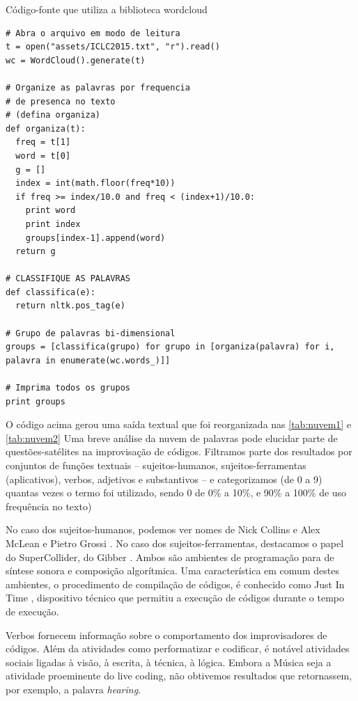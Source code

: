 \begin{example}{Código-fonte que utiliza a biblioteca wordcloud}  
\begin{verbatim}
# Abra o arquivo em modo de leitura
t = open("assets/ICLC2015.txt", "r").read()
wc = WordCloud().generate(t)

# Organize as palavras por frequencia
# de presenca no texto
# (defina organiza)
def organiza(t):
  freq = t[1]
  word = t[0]
  g = []
  index = int(math.floor(freq*10))
  if freq >= index/10.0 and freq < (index+1)/10.0:
    print word
    print index
    groups[index-1].append(word)
  return g

# CLASSIFIQUE AS PALAVRAS
def classifica(e):
  return nltk.pos_tag(e)

# Grupo de palavras bi-dimensional
groups = [classifica(grupo) for grupo in [organiza(palavra) for i, palavra in enumerate(wc.words_)]]

# Imprima todos os grupos 
print groups
\end{verbatim}
\label{cod:nltk}
\end{example}

O código acima gerou uma saída textual que foi reorganizada nas \autoref{tab:nuvem1} e \autoref{tab:nuvem2} Uma breve análise da nuvem de palavras pode elucidar parte de questões-satélites na improvisação de códigos. Filtramos parte dos resultados por conjuntos de funções textuais – sujeitos-humanos, sujeitos-ferramentas (aplicativos), verbos, adjetivos e substantivos – e categorizamos (de 0 a 9) quantas vezes o termo foi utilizado, sendo 0 de 0\% a 10\%, e 90\% a 100\% de uso frequência no texto)

No caso dos sujeitos-humanos, podemos ver nomes de Nick Collins e Alex McLean  e Pietro Grossi . No caso dos sujeitos-ferramentas, destacamos o papel do SuperCollider,  do Gibber \cite{roberts_gibber:_2012 2,roberts_web_2013} . Ambos são ambientes de programação para de síntese sonora e composição algorítmica. Uma característica em comum destes ambientes, o procedimento de compilação de códigos, é conhecido como Just In Time , dispositivo técnico que permitiu a execução de códigos durante o tempo de execução.

Verbos fornecem informação sobre o comportamento dos improvisadores de códigos. Além da atividades como performatizar e codificar, é notável atividades sociais ligadas à visão, à escrita, à técnica, à lógica. Embora a Música seja a atividade proeminente do live coding, não obtivemos resultados que retornassem, por exemplo, a palavra \emph{hearing}.


